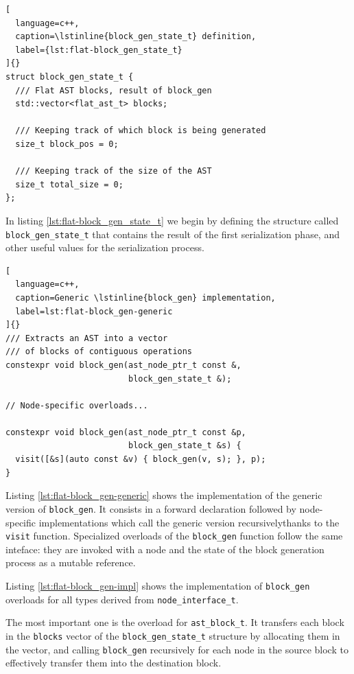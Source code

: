 \documentclass[../main]{subfiles}
\begin{document}
\clearpage%

\begin{lstlisting}[
  language=c++,
  caption=\lstinline{block_gen_state_t} definition,
  label={lst:flat-block_gen_state_t}
]{}
struct block_gen_state_t {
  /// Flat AST blocks, result of block_gen
  std::vector<flat_ast_t> blocks;

  /// Keeping track of which block is being generated
  size_t block_pos = 0;

  /// Keeping track of the size of the AST
  size_t total_size = 0;
};
\end{lstlisting}

In listing \ref{lst:flat-block_gen_state_t} we begin by defining the structure
called \lstinline{block_gen_state_t} that contains the result of the first
serialization phase, and other useful values for the serialization process.

\begin{lstlisting}[
  language=c++,
  caption=Generic \lstinline{block_gen} implementation,
  label=lst:flat-block_gen-generic
]{}
/// Extracts an AST into a vector
/// of blocks of contiguous operations
constexpr void block_gen(ast_node_ptr_t const &,
                         block_gen_state_t &);

// Node-specific overloads...

constexpr void block_gen(ast_node_ptr_t const &p,
                         block_gen_state_t &s) {
  visit([&s](auto const &v) { block_gen(v, s); }, p);
}
\end{lstlisting}

Listing \ref{lst:flat-block_gen-generic} shows the implementation of the generic
version of \lstinline{block_gen}. It consists in a forward declaration
followed by node-specific implementations which call the generic version
recursivelythanks to the  \lstinline{visit} function.
Specialized overloads of the \lstinline{block_gen} function follow the same
inteface: they are invoked with a node and the state of the block generation
process as a mutable reference.

Listing \ref{lst:flat-block_gen-impl} shows the implementation of
\lstinline{block_gen} overloads for all types derived from
\lstinline{node_interface_t}.

The most important one is the overload for \lstinline{ast_block_t}.
It transfers each block in the \lstinline{blocks} vector
of the \lstinline{block_gen_state_t} structure by allocating them in the vector,
and calling \lstinline{block_gen} recursively for each node in the source block
to effectively transfer them into the destination block.
\end{document}
